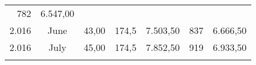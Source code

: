 \documentclass[11pt,A4paper,]{article}
\begin{document}
\begin{longtable}[]{@{}rcrrrrr@{}}
\begin{minipage}[t]{0.09\columnwidth}
782\strut
\end{minipage} & \begin{minipage}[t]{0.20\columnwidth}\raggedleft\strut
6.547,00\strut
\end{minipage}\tabularnewline
\begin{minipage}[t]{0.09\columnwidth}\raggedleft\strut
2.016\strut
\end{minipage} & \begin{minipage}[t]{0.13\columnwidth}\centering\strut
June\strut
\end{minipage} & \begin{minipage}[t]{0.09\columnwidth}\raggedleft\strut
43,00\strut
\end{minipage} & \begin{minipage}[t]{0.09\columnwidth}\raggedleft\strut
174,5\strut
\end{minipage} & \begin{minipage}[t]{0.13\columnwidth}\raggedleft\strut
7.503,50\strut
\end{minipage} & \begin{minipage}[t]{0.09\columnwidth}\raggedleft\strut
837\strut
\end{minipage} & \begin{minipage}[t]{0.20\columnwidth}\raggedleft\strut
6.666,50\strut
\end{minipage}\tabularnewline
\begin{minipage}[t]{0.09\columnwidth}\raggedleft\strut
2.016\strut
\end{minipage} & \begin{minipage}[t]{0.13\columnwidth}\centering\strut
July\strut
\end{minipage} & \begin{minipage}[t]{0.09\columnwidth}\raggedleft\strut
45,00\strut
\end{minipage} & \begin{minipage}[t]{0.09\columnwidth}\raggedleft\strut
174,5\strut
\end{minipage} & \begin{minipage}[t]{0.13\columnwidth}\raggedleft\strut
7.852,50\strut
\end{minipage} & \begin{minipage}[t]{0.09\columnwidth}\raggedleft\strut
919\strut
\end{minipage} & \begin{minipage}[t]{0.20\columnwidth}\raggedleft\strut
6.933,50\strut
\end{minipage}\tabularnewline
\begin{minipage}[t]{0.09\columnwidth}\raggedleft\strut

\end{minipage}
\end{longtable}
\end{document}
